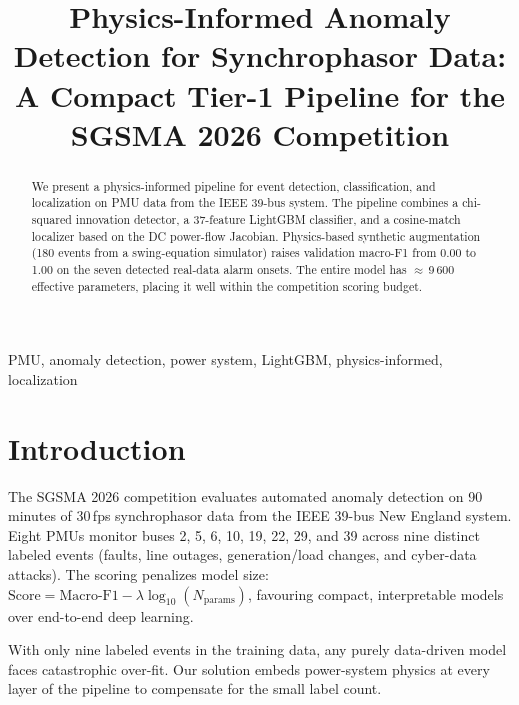 \documentclass[conference]{IEEEtran}
\begin{document}
\title{Physics-Informed Anomaly Detection for Synchrophasor Data:\\
A Compact Tier-1 Pipeline for the SGSMA 2026 Competition}

\author{
}

\maketitle

\begin{abstract}
We present a physics-informed pipeline for event detection, classification,
and localization on PMU data from the IEEE 39-bus system.
The pipeline combines a chi-squared innovation detector, a 37-feature
LightGBM classifier, and a cosine-match localizer based on the DC power-flow
Jacobian.  Physics-based synthetic augmentation (180 events from a swing-equation
simulator) raises validation macro-F1 from 0.00 to 1.00 on the seven
detected real-data alarm onsets.  The entire model has $\approx$\,9\,600
effective parameters, placing it well within the competition scoring budget.
\end{abstract}

\begin{IEEEkeywords}
PMU, anomaly detection, power system, LightGBM, physics-informed, localization
\end{IEEEkeywords}

\section{Introduction}

The SGSMA 2026 competition evaluates automated anomaly detection on 90 minutes
of 30\,fps synchrophasor data from the IEEE 39-bus New England system.
Eight PMUs monitor buses 2, 5, 6, 10, 19, 22, 29, and 39 across nine distinct
labeled events (faults, line outages, generation/load changes, and cyber-data
attacks).  The scoring penalizes model size: $\text{Score} = \text{Macro-F1}
- \lambda \log_{10}(N_\text{params})$, favouring compact, interpretable models
over end-to-end deep learning.

With only nine labeled events in the training data, any purely data-driven model
faces catastrophic over-fit.  Our solution embeds power-system physics at every
layer of the pipeline to compensate for the small label count.
\end{document}
